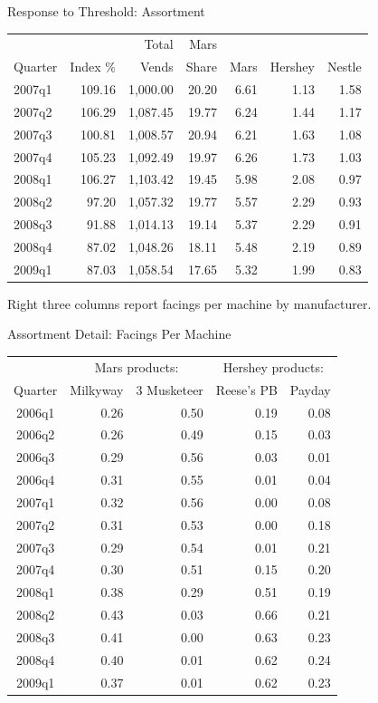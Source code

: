 \begin{frame}{Response to Threshold: Assortment}
\small
\begin{center}
\begin{tabular}{|l | rrr | rrr|} \toprule
 & & Total & Mars  & &  &  \\ 
Quarter &   Index \% & Vends & Share & Mars & Hershey & Nestle \\ \midrule
2007q1 & 109.16 & 1,000.00 & 20.20 & 6.61 & 1.13 & 1.58 \\
2007q2 & 106.29 & 1,087.45 & 19.77 & 6.24 & 1.44 & 1.17 \\
2007q3 & 100.81 & 1,008.57 & 20.94 & 6.21 & 1.63 & 1.08 \\
2007q4 & 105.23 & 1,092.49 & 19.97 & 6.26 & 1.73 & 1.03 \\ \midrule
2008q1 & 106.27 & 1,103.42 & 19.45 & 5.98 & 2.08 & 0.97 \\   \midrule
2008q2 & 97.20 & 1,057.32 & 19.77 & 5.57 & 2.29 & 0.93 \\ 
2008q3 & 91.88 & 1,014.13 & 19.14 & 5.37 & 2.29 & 0.91 \\
2008q4 & 87.02 & 1,048.26 & 18.11 & 5.48 & 2.19 & 0.89 \\
2009q1 & 87.03 & 1,058.54 & 17.65 & 5.32 & 1.99 & 0.83 \\ 
\bottomrule
\end{tabular}
\end{center}

Right three columns report facings per machine by manufacturer.
\end{frame}

\begin{frame}{Assortment Detail: Facings Per Machine}
\footnotesize
\begin{center}
\begin{tabular}{|c | r r r r|}\midrule
&\multicolumn{2}{c}{Mars products:}&\multicolumn{2}{c|}{Hershey products:}\\
Quarter &  Milkyway &  3 Musketeer & Reese's PB & Payday \\
\toprule
2006q1 & 0.26 & 0.50 & 0.19 & 0.08 \\
2006q2 & 0.26 & 0.49 & 0.15 & 0.03 \\
2006q3 & 0.29 & 0.56 & 0.03 & 0.01 \\
2006q4 & 0.31 & 0.55 & 0.01 & 0.04 \\
2007q1 & 0.32 & 0.56 & 0.00 & 0.08 \\
2007q2 & 0.31 & 0.53 & 0.00 & 0.18 \\
2007q3 & 0.29 & 0.54 & 0.01 & 0.21 \\
2007q4 & 0.30 & 0.51 & 0.15 & 0.20 \\ \midrule
2008q1 & 0.38 & 0.29 & 0.51 & 0.19 \\  \midrule
2008q2 & 0.43 & 0.03 & 0.66 & 0.21 \\ 
2008q3 & 0.41 & 0.00 & 0.63 & 0.23 \\
2008q4 & 0.40 & 0.01 & 0.62 & 0.24 \\
2009q1 & 0.37 & 0.01 & 0.62 & 0.23 \\ \bottomrule
\end{tabular}
\end{center}
\end{frame}



